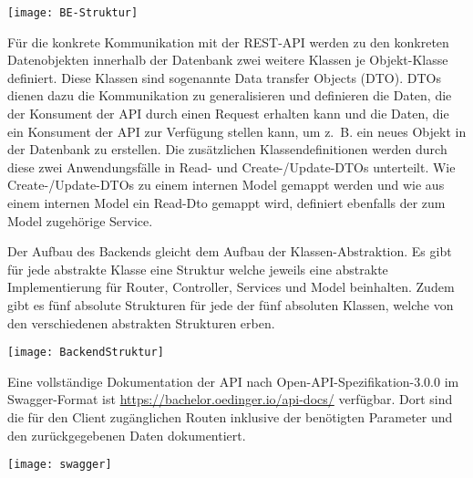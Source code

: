 \vspace{20pt}
\begin{center}
    \begin{minipage}{1\linewidth}
        \texttt{[image: BE-Struktur]}
    \end{minipage}
\end{center}
\vspace{20pt}

Für die konkrete Kommunikation mit der REST-API werden zu den konkreten Datenobjekten innerhalb der Datenbank zwei weitere Klassen je Objekt-Klasse definiert. Diese Klassen sind sogenannte Data transfer Objects (DTO). DTOs dienen dazu die Kommunikation zu generalisieren und definieren die Daten, die der Konsument der API durch einen Request erhalten kann und die Daten, die ein Konsument der API zur Verfügung stellen kann, um z. B. ein neues Objekt in der Datenbank zu erstellen. Die zusätzlichen Klassendefinitionen werden durch diese zwei Anwendungsfälle in Read- und Create-/Update-DTOs unterteilt. Wie Create-/Update-DTOs zu einem internen Model gemappt werden und wie aus einem internen Model ein Read-Dto gemappt wird, definiert ebenfalls der zum Model zugehörige Service.

Der Aufbau des Backends gleicht dem Aufbau der Klassen-Abstraktion. Es gibt für jede abstrakte Klasse eine Struktur welche jeweils eine abstrakte Implementierung für Router, Controller, Services und Model beinhalten.
Zudem gibt es fünf absolute Strukturen für jede der fünf absoluten Klassen, welche von den verschiedenen abstrakten Strukturen erben.

\vspace{20pt}
\begin{center}
    \begin{minipage}{0.7\linewidth}
        \texttt{[image: BackendStruktur]}
    \end{minipage}
\end{center}
\vspace{20pt}

Eine vollständige Dokumentation der API nach Open-API-Spezifikation-3.0.0 im Swagger-Format ist \href{https://bachelor.oedinger.io/api-docs/}{https://bachelor.oedinger.io/api-docs/} verfügbar. Dort sind die für den Client zugänglichen Routen inklusive der benötigten Parameter und den zurückgegebenen Daten dokumentiert.

\vspace{20pt}
\begin{center}
    \begin{minipage}{0.95\linewidth}
        \texttt{[image: swagger]}
    \end{minipage}
\end{center}
\vspace{20pt}

